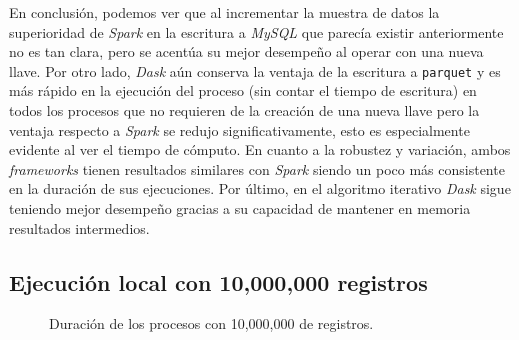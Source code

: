En conclusión, podemos ver que al incrementar la muestra de datos la superioridad de \textit{Spark} en la escritura a \textit{MySQL} que parecía existir anteriormente no es tan clara, pero se acentúa su mejor desempeño al operar con una nueva llave. Por otro lado, \textit{Dask} aún conserva la ventaja de la escritura a \texttt{parquet} y es más rápido en la ejecución del proceso (sin contar el tiempo de escritura) en todos los procesos que no requieren de la creación de una nueva llave pero la ventaja respecto a \textit{Spark} se redujo significativamente, esto es especialmente evidente al ver el tiempo de cómputo. En cuanto a la robustez y variación, ambos \textit{frameworks} tienen resultados similares con \textit{Spark} siendo un poco más consistente en la duración de sus ejecuciones. Por último, en el algoritmo iterativo \textit{Dask} sigue teniendo mejor desempeño gracias a su capacidad de mantener en memoria resultados intermedios.

\subsection{Ejecución local con 10,000,000 registros}

\begin{center}
\begin{figure}
\caption{Duración de los procesos con 10,000,000 de registros.}
\label{barras:duracion10M}
\end{figure}
\end{center}

